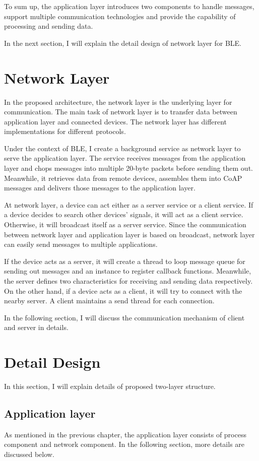 \documentclass{Nan_Thesis}
\begin{document}
To sum up, the application layer introduces two components to handle messages, support multiple communication technologies and provide the capability of processing and sending data.

In the next section, I will explain the detail design of network layer for BLE.
\section{Network Layer} 
In the proposed architecture, the network layer is the underlying layer for communication. 
The main task of network layer is to transfer data between application layer and connected devices. The network layer has different implementations for different protocols. 

Under the context of BLE, I create a background service as network layer to serve the application layer. The service receives messages from the application layer and chops messages into multiple 20-byte packets before sending them out. Meanwhile, it retrieves data from remote devices, assembles them into CoAP messages and delivers those messages to the application layer.

At network layer, a device can act either as a server service or a client service. If a device decides to search other devices’ signals, it will act as a client service. Otherwise, it will broadcast itself as a server service. Since the communication between network layer and application layer is based on broadcast, network layer can easily send messages to multiple applications.

If the device acts as a server, it will create a thread to loop message queue for sending out messages and an instance to register callback functions. Meanwhile, the server defines two characteristics for receiving and sending data respectively. On the other hand, if a device acts as a client, it will try to connect with the nearby server. A client maintains a send thread for each connection. 

In the following section, I will discuss the communication mechanism of client and server in details.
\section{Detail Design} 
In this section, I will explain details of proposed two-layer structure.
\subsection{Application layer}
As mentioned in the previous chapter, the application layer consists of process component and network component. In the following section, more details are discussed below.  
\end{document}

